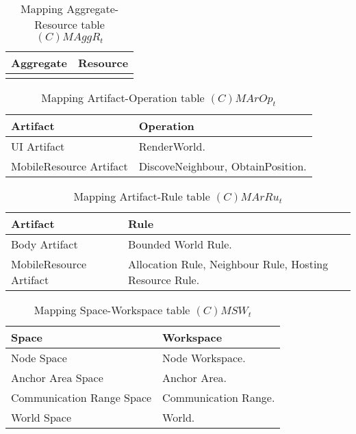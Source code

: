 \begin{table}[H]
	\centering
	\begin{tabular}{|p{4cm}|p{8cm}|}
			\hline
			\textbf{Aggregate} & \textbf{Resource} \\
			\hline
			& \\
			\hline
		\end{tabular}
	\caption{Mapping Aggregate-Resource table $(C)MAggR_t$}
	\label{tab:cmaggrt}
\end{table}

\begin{table}[H]
	\centering
	\begin{tabular}{|p{4cm}|p{8cm}|}
			\hline
			\textbf{Artifact} & \textbf{Operation} \\
			\hline
			UI Artifact & RenderWorld. \\
			\hline
      MobileResource Artifact & DiscoveNeighbour,  ObtainPosition. \\
			\hline
		\end{tabular}
	\caption{Mapping Artifact-Operation table $(C)MArOp_t$}
	\label{tab:cmaropt}
\end{table}

\begin{table}[H]
	\centering
	\begin{tabular}{|p{4cm}|p{8cm}|}
			\hline
			\textbf{Artifact} & \textbf{Rule} \\
			\hline
			Body Artifact & Bounded World Rule. \\
			\hline
      MobileResource Artifact & Allocation Rule, Neighbour Rule, Hosting
      Resource Rule. \\
			\hline
		\end{tabular}
	\caption{Mapping Artifact-Rule table $(C)MArRu_t$}
	\label{tab:cmarrut}
\end{table}

\begin{table}[H]
	\centering
	\begin{tabular}{|p{4cm}|p{8cm}|}
			\hline
			\textbf{Space} & \textbf{Workspace} \\
			\hline
			Node Space & Node Workspace. \\
			\hline
			Anchor Area Space & Anchor Area. \\
			\hline
			Communication Range Space & Communication Range.\\
			\hline
			World Space & World. \\
			\hline
		\end{tabular}
	\caption{Mapping Space-Workspace table $(C)MSW_t$}
	\label{tab:cmsrt}
\end{table}

